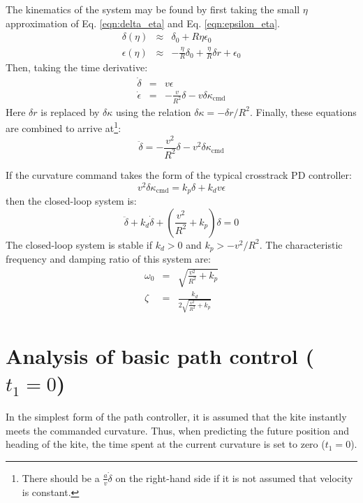\documentclass{article} %
\begin{document}
The kinematics of the system may be found by first taking the small
$\eta$ approximation of Eq. \ref{eqn:delta_eta} and
Eq. \ref{eqn:epsilon_eta}.
%
\begin{eqnarray}
\delta(\eta) &\approx& \delta_0 + R \eta \epsilon_0 \\
\epsilon(\eta) &\approx& -\frac{\eta}{R} \delta_0 + \frac{\eta}{R} \delta r +
\epsilon_0
\end{eqnarray}
%
Then, taking the time derivative:
%
\begin{eqnarray}
\dot{\delta} &=& v \epsilon \\
\dot{\epsilon} &=& -\frac{v}{R^2} \delta - v \delta \kappa_{\mathrm{cmd}}
\end{eqnarray}
%
Here $\delta r$ is replaced by $\delta \kappa$ using the relation
$\delta \kappa = -\delta r / R^2$.  Finally, these equations are
combined to arrive at\footnote{There should be a $\frac{a}{v} \dot{\delta}$
on the right-hand side if it is not assumed that velocity is constant.}:
%
\begin{equation}
\ddot{\delta} = -\frac{v^2}{R^2} \delta - v^2 \delta \kappa_{\mathrm{cmd}}
\label{eqn:delta_diffeq}
\end{equation}

If the curvature command takes the form of the typical crosstrack PD
controller:
%
\begin{equation}
v^2 \delta \kappa_{\mathrm{cmd}} = k_p \delta + k_d v \epsilon
\end{equation}
%
then the closed-loop system is:
%
\begin{equation}
\ddot{\delta} + k_d \dot{\delta} + \left(\frac{v^2}{R^2} + k_p \right) \delta = 0
\end{equation}
%
The closed-loop system is stable if $k_d > 0$ and $k_p > -v^2/R^2$.
The characteristic frequency and damping ratio of this system are:
%
\begin{eqnarray}
\omega_0 &=& \sqrt{\frac{v^2}{R^2} + k_p} \label{eqn:omega0} \\
\zeta &=& \frac{k_d}{2 \sqrt{\frac{v^2}{R^2} + k_p}} \label{eqn:zeta}
\end{eqnarray}

\section{Analysis of basic path control ($t_1 = 0$)}

In the simplest form of the path controller, it is assumed that the
kite instantly meets the commanded curvature.  Thus, when predicting
the future position and heading of the kite, the time spent at the
current curvature is set to zero ($t_1 = 0$).
\end{document}
